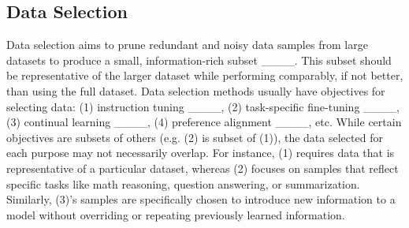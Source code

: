\subsection{Data Selection}
Data selection aims to prune redundant and noisy data samples from large datasets to produce a small, information-rich subset ____. This subset should be representative of the larger dataset while performing comparably, if not better, than using the full dataset. Data selection methods usually have objectives for selecting data: (1) instruction tuning ____, (2) task-specific fine-tuning ____, (3) continual learning ____, (4) preference alignment ____, etc. While certain objectives are subsets of others (e.g. (2) is subset of (1)), the data selected for each purpose may not necessarily overlap. For instance, (1) requires data that is representative of a particular dataset, whereas (2) focuses on samples that reflect specific tasks like math reasoning, question answering, or summarization. Similarly, (3)'s samples are specifically chosen to introduce new information to a model without overriding or repeating previously learned information.